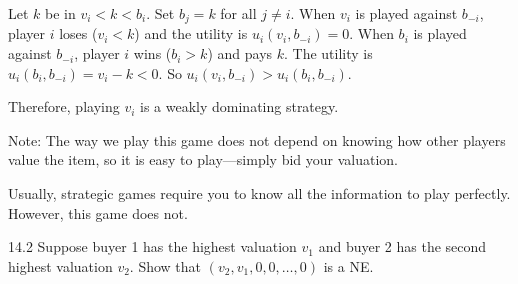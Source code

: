 \documentclass[12pt,letterpaper]{report}
\begin{document}
\begin{thmproof}
\begin{enumcase}
      Let $k$ be in $v_i < k < b_i$.
      Set $b_j = k$ for all $j \neq i$.
      When $v_i$ is played against $b_{-i}$, player $i$ loses ($v_i < k$) and the utility is
      $u_i(v_i, b_{-i}) = 0$.
      When $b_i$ is played against $b_{-i}$, player $i$ wins ($b_i > k$) and pays $k$.
      The utility is $u_i(b_i, b_{-i}) = v_i - k < 0$.
      So $u_i(v_i, b_{-i}) > u_i(b_i, b_{-i})$.
  \end{enumcase}
  Therefore, playing $v_i$ is a weakly dominating strategy.
\end{thmproof}

Note: The way we play this game does not depend on knowing how other players value the item, so it
is easy to play---simply bid your valuation.

Usually, strategic games require you to know all the information to play perfectly.
However, this game does not.

\begin{exer}{}{14.2}
  Suppose buyer 1 has the highest valuation $v_1$ and buyer 2 has the second highest valuation
  $v_2$.
  Show that $(v_2, v_1, 0, 0, \ldots, 0)$ is a NE.
\end{exer}

\end{document}
